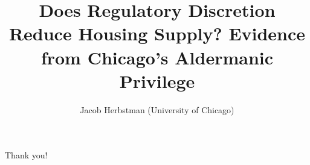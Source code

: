 \documentclass[11pt,notes=hide,aspectratio=169,mathserif]{beamer}
\title[Aldermanic Privilege]{Does Regulatory Discretion Reduce Housing Supply? Evidence from Chicago's Aldermanic Privilege}
\author[Jacob Herbstman]{Jacob Herbstman (University of Chicago)}
\date{\monthname[\the\month] \the\year}
\begin{document}
\begin{frame}[plain]
\titlepage
\note{
	\begin{itemize}
	\end{itemize}
}
\end{frame}















\begin{frame}[plain]
    \begin{center}{\LARGE Thank you!}\end{center}
\end{frame}


\appendix
\begin{frame}[allowframebreaks]{}
    
    
\end{frame}





\end{document}
